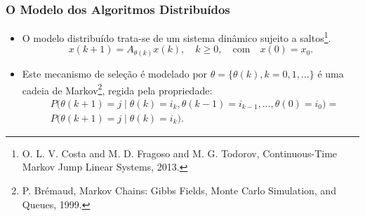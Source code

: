 \documentclass{beamer}
\begin{document}
\begin{frame}
	\frametitle{O Modelo dos Algoritmos Distribuídos}

\begin{itemize}	
\item O modelo distribuído trata-se de um sistema din\^amico sujeito a saltos\footnote{\tiny \justifying O. L. V. Costa and M. D. Fragoso and M. G. Todorov, Continuous-Time {Markov} Jump Linear Systems, 2013.}.
%
\begin{equation}
	x(k+1) = A_{\theta(k)}x(k), \quad k\geq0, \quad \text{com} \quad x(0) = x_0. 
\end{equation}
	
\vspace{0.2cm}	

\item Este mecanismo de seleção é modelado por $\theta = \{\theta(k), k = 0,1,\ldots\}$ é uma cadeia de Markov\footnote{\tiny \justifying P. Br\'emaud, Markov Chains: Gibbs Fields, Monte Carlo Simulation, and Queues, 1999.}, regida pela propriedade:
%
\begin{align}\nonumber
	&P \bigl( \theta(k+1) = j \mid  \theta(k) = i_k, \theta(k-1) = i_{k-1}, \ldots, \theta(0) = i_0\bigr) =\\
	&P \bigl( \theta(k+1) = j \mid  \theta(k) = i_k\bigr).
\end{align}

\end{itemize}

\end{frame}
\end{document}
